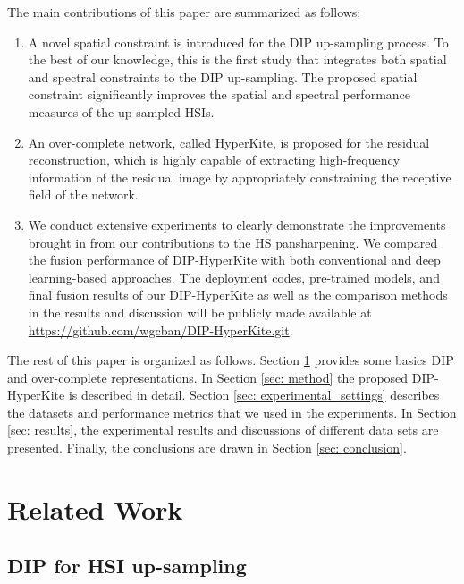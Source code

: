\documentclass[journal]{IEEEtran}
\begin{document}
The main contributions of this paper are summarized as follows:
\begin{enumerate}
    \item A novel spatial constraint is introduced for the DIP up-sampling process. To the best of our knowledge, this is the first study that integrates both spatial and spectral constraints to the DIP up-sampling. The proposed spatial constraint significantly improves the spatial and spectral performance measures of the up-sampled HSIs.  
    \item An over-complete network, called HyperKite, is proposed for the residual reconstruction, which is highly capable of extracting high-frequency information of the residual image by appropriately constraining the receptive field of the network.
    \item We conduct extensive experiments to clearly demonstrate the improvements brought in from our contributions to the HS pansharpening. We compared the fusion performance of DIP-HyperKite with both conventional and deep learning-based approaches. The deployment codes, pre-trained models, and final fusion results of our DIP-HyperKite as well as the comparison methods in the results and discussion will be publicly made available at \url{https://github.com/wgcban/DIP-HyperKite.git}.
\end{enumerate}
The rest of this paper is organized as follows. Section \ref{sec: related_work} provides some basics DIP and over-complete representations. In Section \ref{sec: method} the proposed DIP-HyperKite is described in detail. Section \ref{sec: experimental_settings} describes the datasets and performance metrics that we used in the experiments. In Section \ref{sec: results}, the experimental results and discussions of different data sets are presented. Finally, the conclusions are drawn in Section \ref{sec: conclusion}.

\section{Related Work}
\label{sec: related_work}
\subsection{DIP for HSI up-sampling}
    \label{rw: dip}
\end{document}
